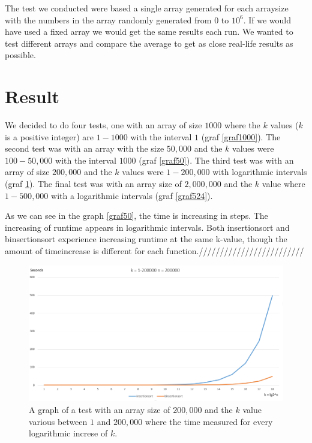 \documentclass[paper=a4, fontsize=11pt]{scrartcl}
\numberwithin{equation}{section}		%
\numberwithin{figure}{section}			%
\numberwithin{table}{section}				%
\begin{document}
The test we conducted were based a single array generated for each arraysize with the numbers in the array randomly generated from 0 to $10^6$. If we would have used a fixed array we would get the same results each run. We wanted to test different arrays and compare the average to get as close real-life results as possible.

\section{Result}
We decided to do four tests, one with an array of size $1000$ where the $k$ values ($k$ is a positive integer) are $1-1000$ with the interval $1$ (graf \ref{graf1000}). The second test was with an array with the size $50,000$ and the $k$ values were $100-50,000$ with the interval $1000$ (graf \ref{graf50}). The third test was with an array of size $200,000$ and the $k$ values were $1-200,000$ with logarithmic intervals (graf \ref{graf200}). The final test was with an array size of $2,000,000$ and the $k$ value where $1-500,000$ with a logarithmic intervals (graf \ref{graf524}).



As we can see in the graph \ref{graf50}, the time is increasing in steps. The increasing of runtime appears in logarithmic intervals. Both insertionsort and binsertionsort experience increasing runtime at the same k-value, though the amount of timeincrease is different for each function./////////////////////////


\begin{figure}[ht!]
\centering
\includegraphics[width=150mm]{graf_lg1-200000.png}
\caption{A graph of a test with an array size of $200,000$ and the $k$ value various between $1$ and $200,000$ where the time measured
 for every logarithmic increse of $k$. \label{graf200}}
\end{figure}
\end{document}
